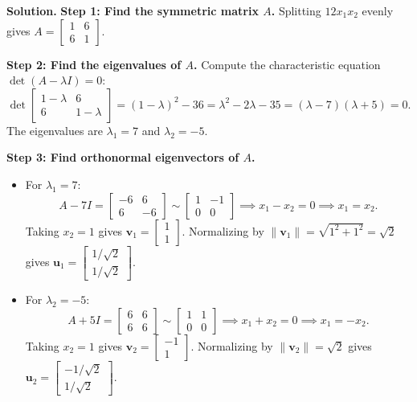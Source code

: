 \documentclass[11pt, letterpaper]{article}
\theoremstyle{definition}
\theoremstyle{remark}
\begin{document}
\textbf{Solution.}
\textbf{Step 1: Find the symmetric matrix $A$.}
Splitting $12x_1x_2$ evenly gives $A = \begin{bmatrix} 1 & 6 \\ 6 & 1 \end{bmatrix}$.

\textbf{Step 2: Find the eigenvalues of $A$.}
Compute the characteristic equation $\det(A - \lambda I) = 0$:
\[
\det \begin{bmatrix} 1 - \lambda & 6 \\ 6 & 1 - \lambda \end{bmatrix} = (1 - \lambda)^2 - 36 = \lambda^2 - 2\lambda - 35 = (\lambda - 7)(\lambda + 5) = 0.
\]
The eigenvalues are $\lambda_1 = 7$ and $\lambda_2 = -5$.

\textbf{Step 3: Find orthonormal eigenvectors of $A$.}
\begin{itemize}
    \item For $\lambda_1 = 7$:
    \[
    A - 7I = \begin{bmatrix} -6 & 6 \\ 6 & -6 \end{bmatrix} \sim \begin{bmatrix} 1 & -1 \\ 0 & 0 \end{bmatrix} \implies x_1 - x_2 = 0 \implies x_1 = x_2.
    \]
    Taking $x_2 = 1$ gives $\mathbf{v}_1 = \begin{bmatrix} 1 \\ 1 \end{bmatrix}$. Normalizing by $\|\mathbf{v}_1\| = \sqrt{1^2 + 1^2} = \sqrt{2}$ gives $\mathbf{u}_1 = \begin{bmatrix} 1/\sqrt{2} \\ 1/\sqrt{2} \end{bmatrix}$.
    \item For $\lambda_2 = -5$:
    \[
    A + 5I = \begin{bmatrix} 6 & 6 \\ 6 & 6 \end{bmatrix} \sim \begin{bmatrix} 1 & 1 \\ 0 & 0 \end{bmatrix} \implies x_1 + x_2 = 0 \implies x_1 = -x_2.
    \]
    Taking $x_2 = 1$ gives $\mathbf{v}_2 = \begin{bmatrix} -1 \\ 1 \end{bmatrix}$. Normalizing by $\|\mathbf{v}_2\| = \sqrt{2}$ gives $\mathbf{u}_2 = \begin{bmatrix} -1/\sqrt{2} \\ 1/\sqrt{2} \end{bmatrix}$.
\end{itemize}
\end{document}
